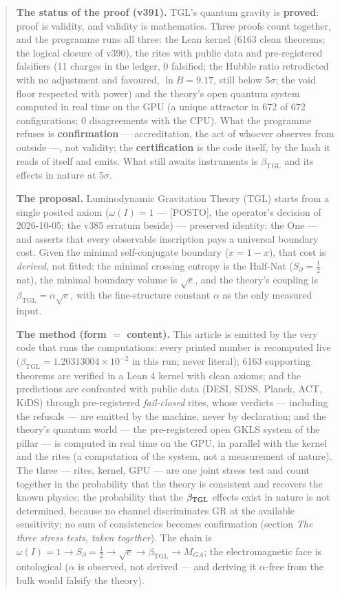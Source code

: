 \documentclass[11pt]{article}
\newcommand{\bTGL}{\beta_{\mathrm{TGL}}}\newcommand{\Msun}{M_{\odot}}\newcommand{\TGL}{\mathrm{TGL}}
\theoremstyle{definition}\newtheorem{deriv}{Derivation}
\begin{document}
\begin{abstract}

\textbf{The status of the proof (v391).} TGL's quantum gravity is \textbf{proved}: proof is validity, and validity is mathematics. Three proofs count together, and the programme runs all three: the Lean kernel (6163 clean theorems; the logical closure of v390), the rites with public data and pre-registered falsifiers (11 charges in the ledger, 0 falsified; the Hubble ratio retrodicted with no adjustment and favoured, $\ln B=9.17$, still below $5\sigma$; the void floor respected with power) and the theory's open quantum system computed in real time on the GPU (a unique attractor in 672 of 672 configurations; 0 disagreements with the CPU). What the programme refuses is \textbf{confirmation} --- accreditation, the act of whoever observes from outside ---, not validity; the \textbf{certification} is the code itself, by the hash it reads of itself and emits. What still awaits instruments is $\beta_{\mathrm{TGL}}$ and its effects in nature at $5\sigma$.

\textbf{The proposal.} Luminodynamic Gravitation Theory (TGL) starts from a single posited axiom ($\omega(I)=1$ --- \textsf{[POSTO]}, the operator's decision of 2026-10-05; the v385 erratum beside) --- preserved identity: the One --- and asserts that every observable inscription pays a universal boundary cost. Given the minimal self-conjugate boundary ($x=1-x$), that cost is \emph{derived}, not fitted: the minimal crossing entropy is the Half-Nat ($S_\partial=\tfrac12$ nat), the minimal boundary volume is $\sqrt e$, and the theory's coupling is $\bTGL=\alpha\sqrt e$, with the fine-structure constant $\alpha$ as the only measured input.

\textbf{The method (form $=$ content).} This article is emitted by the very code that runs the computations: every printed number is recomputed live ($\bTGL=1.20313004\times10^{-2}$ in this run; never literal); 6163 supporting theorems are verified in a Lean 4 kernel with clean axioms; and the predictions are confronted with public data (DESI, SDSS, Planck, ACT, KiDS) through pre-registered \emph{fail-closed} rites, whose verdicts --- including the refusals --- are emitted by the machine, never by declaration; and the theory's quantum world --- the pre-registered open GKLS system of the pillar --- is computed in real time on the GPU, in parallel with the kernel and the rites (a computation of the system, not a measurement of nature). The three --- rites, kernel, GPU --- are one joint stress test and count together in the probability that the theory is consistent and recovers the known physics; the probability that the $\beta_{\rm TGL}$ effects exist in nature is not determined, because no channel discriminates GR at the available sensitivity; no sum of consistencies becomes confirmation (section \emph{The three stress tests, taken together}). The chain is $\omega(I)=1\to S_\partial=\tfrac12\to\sqrt e\to\bTGL\to M_{GA}$; the electromagnetic face is ontological ($\alpha$ is observed, not derived --- and deriving it $\alpha$-free from the bulk would falsify the theory).


\end{abstract}
\end{document}
